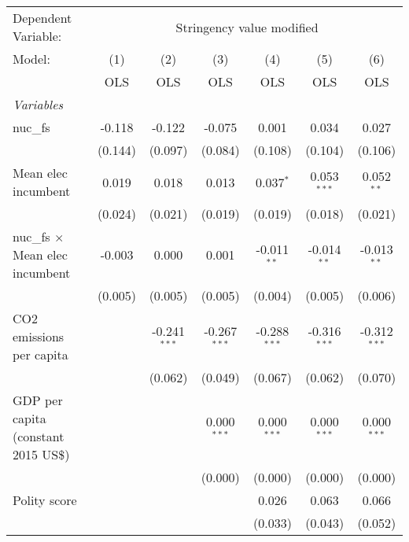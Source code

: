 
\begingroup
\centering
\begin{tabular}{lcccccc}
   \toprule
   Dependent Variable: & \multicolumn{6}{c}{Stringency value modified}\\
   Model:                                 & (1)     & (2)            & (3)            & (4)            & (5)            & (6)\\  
                                          &  OLS    & OLS            & OLS            & OLS            & OLS            & OLS\\  
   \midrule
   \emph{Variables}\\
   nuc\_fs                                & -0.118  & -0.122         & -0.075         & 0.001          & 0.034          & 0.027\\   
                                          & (0.144) & (0.097)        & (0.084)        & (0.108)        & (0.104)        & (0.106)\\   
   Mean elec incumbent                    & 0.019   & 0.018          & 0.013          & 0.037$^{*}$    & 0.053$^{***}$  & 0.052$^{**}$\\   
                                          & (0.024) & (0.021)        & (0.019)        & (0.019)        & (0.018)        & (0.021)\\   
   nuc\_fs $\times$ Mean elec incumbent   & -0.003  & 0.000          & 0.001          & -0.011$^{**}$  & -0.014$^{**}$  & -0.013$^{**}$\\   
                                          & (0.005) & (0.005)        & (0.005)        & (0.004)        & (0.005)        & (0.006)\\   
   CO2 emissions per capita               &         & -0.241$^{***}$ & -0.267$^{***}$ & -0.288$^{***}$ & -0.316$^{***}$ & -0.312$^{***}$\\   
                                          &         & (0.062)        & (0.049)        & (0.067)        & (0.062)        & (0.070)\\   
   GDP per capita (constant 2015 US\$)    &         &                & 0.000$^{***}$  & 0.000$^{***}$  & 0.000$^{***}$  & 0.000$^{***}$\\   
                                          &         &                & (0.000)        & (0.000)        & (0.000)        & (0.000)\\   
   Polity score                           &         &                &                & 0.026          & 0.063          & 0.066\\   
                                          &         &                &                & (0.033)        & (0.043)        & (0.052)\\   

\end{tabular}
